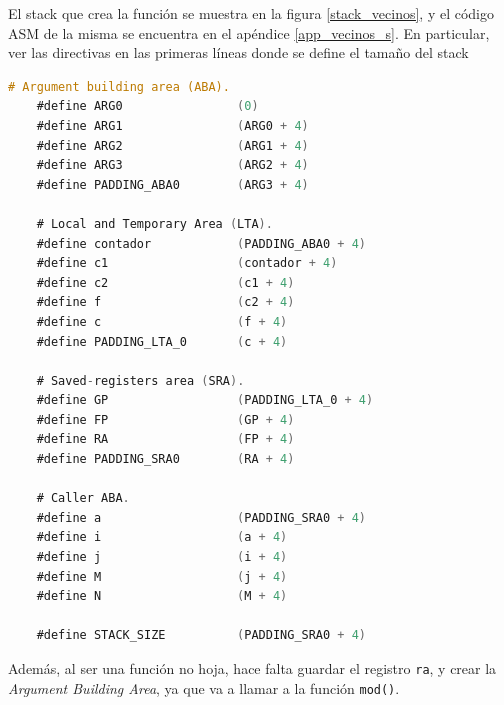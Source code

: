 \documentclass[a4paper,12pt]{article}
\numberwithin{equation}{section}
\numberwithin{figure}{section}
\begin{document}
	El stack que crea la función se muestra en la figura \ref{stack_vecinos}, y el código ASM de la misma se encuentra en el apéndice \ref{app_vecinos_s}. En particular, ver las directivas en las primeras líneas donde se define el tamaño del stack
	\begin{lstlisting}[language=C, style=StyleC]
	# Argument building area (ABA).
	#define ARG0                (0)
	#define ARG1                (ARG0 + 4)
	#define ARG2                (ARG1 + 4)
	#define ARG3                (ARG2 + 4)
	#define PADDING_ABA0        (ARG3 + 4)
	
	# Local and Temporary Area (LTA).
	#define contador            (PADDING_ABA0 + 4)
	#define c1                  (contador + 4)
	#define c2                  (c1 + 4)
	#define f                   (c2 + 4)
	#define c                   (f + 4)
	#define PADDING_LTA_0       (c + 4)
	
	# Saved-registers area (SRA).
	#define GP                  (PADDING_LTA_0 + 4)
	#define FP                  (GP + 4)
	#define RA                  (FP + 4)
	#define PADDING_SRA0        (RA + 4)
	
	# Caller ABA.
	#define a                   (PADDING_SRA0 + 4)
	#define i                   (a + 4)
	#define j                   (i + 4)
	#define M                   (j + 4)
	#define N                   (M + 4)
	
	#define STACK_SIZE          (PADDING_SRA0 + 4)
	\end{lstlisting}
	
	Además, al ser una función no hoja, hace falta guardar el registro \texttt{ra}, y crear la \textit{Argument Building Area}, ya que va a llamar a la función \texttt{mod()}.
	
\end{document}

